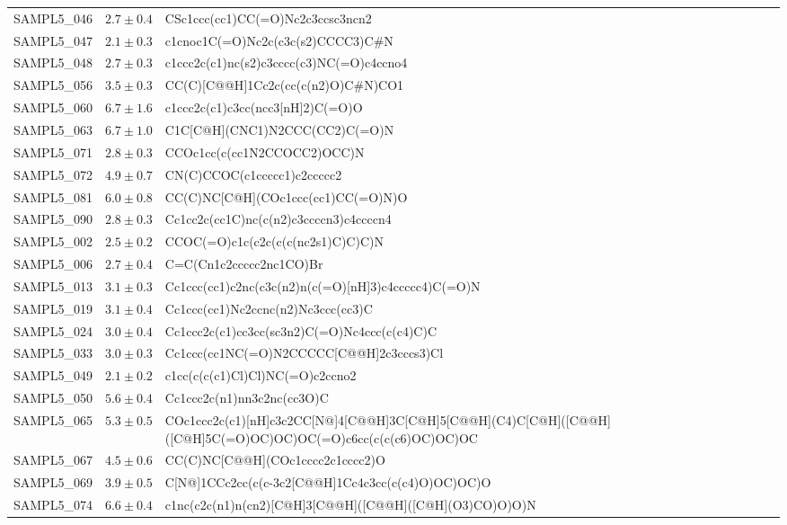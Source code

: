 \begin{tabular}{| p{2cm} | p{2cm} | p{10cm} |}
SAMPL5\_046 & $ 2.7 \pm 0.4 $ & CSc1ccc(cc1)CC(=O)Nc2c3ccsc3ncn2 \\
SAMPL5\_047 & $ 2.1 \pm 0.3 $ & c1cnoc1C(=O)Nc2c(c3c(s2)CCCC3)C\#N \\
SAMPL5\_048 & $ 2.7 \pm 0.3 $ & c1ccc2c(c1)nc(s2)c3cccc(c3)NC(=O)c4ccno4 \\
SAMPL5\_056 & $ 3.5 \pm 0.3 $ & CC(C){[}C@@H{]}1Cc2c(cc(c(n2)O)C\#N)CO1 \\
SAMPL5\_060 & $ 6.7 \pm 1.6 $ & c1ccc2c(c1)c3cc(ncc3{[}nH{]}2)C(=O)O \\
SAMPL5\_063 & $ 6.7 \pm 1.0 $ & C1C{[}C@H{]}(CNC1)N2CCC(CC2)C(=O)N \\
SAMPL5\_071 & $ 2.8 \pm 0.3 $ & CCOc1cc(c(cc1N2CCOCC2)OCC)N \\
SAMPL5\_072 & $ 4.9 \pm 0.7 $ & CN(C)CCOC(c1ccccc1)c2ccccc2 \\
SAMPL5\_081 & $ 6.0 \pm 0.8 $ & CC(C)NC{[}C@H{]}(COc1ccc(cc1)CC(=O)N)O \\
SAMPL5\_090 & $ 2.8 \pm 0.3 $ & Cc1cc2c(cc1C)nc(c(n2)c3ccccn3)c4ccccn4 \\
\hline
SAMPL5\_002 & $ 2.5 \pm 0.2 $ & CCOC(=O)c1c(c2c(c(c(nc2s1)C)C)C)N \\
SAMPL5\_006 & $ 2.7 \pm 0.4 $ & C=C(Cn1c2ccccc2nc1CO)Br \\
SAMPL5\_013 & $ 3.1 \pm 0.3 $ & Cc1ccc(cc1)c2nc(c3c(n2)n(c(=O){[}nH{]}3)c4ccccc4)C(=O)N \\
SAMPL5\_019 & $ 3.1 \pm 0.4 $ & Cc1ccc(cc1)Nc2ccnc(n2)Nc3ccc(cc3)C \\
SAMPL5\_024 & $ 3.0 \pm 0.4 $ & Cc1ccc2c(c1)cc3cc(sc3n2)C(=O)Nc4ccc(c(c4)C)C \\
SAMPL5\_033 & $ 3.0 \pm 0.3 $ & Cc1ccc(cc1NC(=O)N2CCCCC{[}C@@H{]}2c3cccs3)Cl \\
SAMPL5\_049 & $ 2.1 \pm 0.2 $ & c1cc(c(c(c1)Cl)Cl)NC(=O)c2ccno2 \\
SAMPL5\_050 & $ 5.6 \pm 0.4 $ & Cc1ccc2c(n1)nn3c2nc(cc3O)C \\
SAMPL5\_065 & $ 5.3 \pm 0.5 $ & COc1ccc2c(c1){[}nH{]}c3c2CC{[}N@{]}4{[}C@@H{]}3C{[}C@H{]}5{[}C@@H{]}(C4)C{[}C@H{]}({[}C@@H{]}({[}C@H{]}5C(=O)OC)OC)OC(=O)c6cc(c(c(c6)OC)OC)OC \\
SAMPL5\_067 & $ 4.5 \pm 0.6 $ & CC(C)NC{[}C@@H{]}(COc1cccc2c1cccc2)O \\
SAMPL5\_069 & $ 3.9 \pm 0.5 $ & C{[}N@{]}1CCc2cc(c(c-3c2{[}C@@H{]}1Cc4c3cc(c(c4)O)OC)OC)O \\
SAMPL5\_074 & $ 6.6 \pm 0.4 $ & c1nc(c2c(n1)n(cn2){[}C@H{]}3{[}C@@H{]}({[}C@@H{]}({[}C@H{]}(O3)CO)O)O)N \\

\end{tabular}
